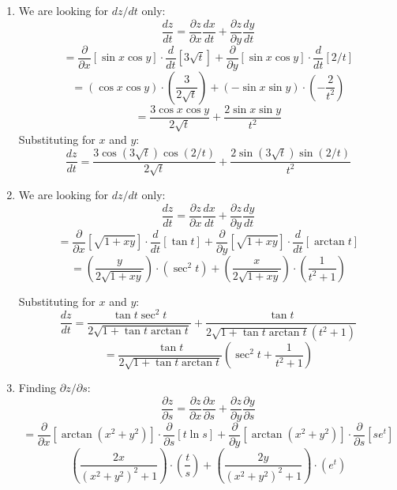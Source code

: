 \begin{Answer}[ref = chain]
\begin{enumerate}
    \item We are looking for $dz / dt$ only:
    $$\frac{dz}{dt} = \frac{\partial z}{\partial x} \frac{dx}{dt} + \frac{
    \partial z}{\partial y} \frac{dy}{dt}$$
    $$= \frac{\partial}{\partial x} \left[ \sin{x}\cos{y} \right] \cdot 
    \frac{d}{dt} \left[ 3\sqrt{t} \right] + \frac{\partial}{\partial y} \left[ 
    \sin{x}\cos{y} \right] \cdot \frac{d}{dt} \left[ 2/t \right]$$
    $$= \left( \cos{x}\cos{y} \right) \cdot \left( \frac{3}{2\sqrt{t}} \right) 
    + \left( -\sin{x}\sin{y} \right) \cdot \left( -\frac{2}{t^2} \right)$$
    $$= \frac{3\cos{x}\cos{y}}{2\sqrt{t}} + \frac{2\sin{x}\sin{y}}{t^2}$$
    Substituting for $x$ and $y$:
    $$\frac{dz}{dt} = \frac{3\cos{ \left( 3\sqrt{t} \right)}\cos{\left(2/t 
    \right)}}{2\sqrt{t}} + \frac{2\sin{\left( 3\sqrt{t} \right)}\sin{ \left( 
    2/t \right)}}{t^2}$$

    \item We are looking for $dz / dt$ only:
    $$\frac{dz}{dt} = \frac{\partial z}{\partial x} \frac{dx}{dt} + \frac{
    \partial z}{\partial y} \frac{dy}{dt}$$
    $$= \frac{\partial}{\partial x} \left[ \sqrt{1 + xy} \right] \cdot 
    \frac{d}{dt} \left[ \tan{t} \right] + \frac{\partial}{\partial y} \left[ 
    \sqrt{1 + xy} \right] \cdot \frac{d}{dt} \left[ \arctan{t} \right]$$
    $$= \left( \frac{y}{2\sqrt{1 + xy}} \right) \cdot \left( \sec^2{t} \right) 
    + \left( \frac{x}{2\sqrt{1 + xy}} \right) \cdot \left( \frac{1}{t^2 + 1} 
    \right)$$

    Substituting for $x$ and $y$:
    $$\frac{dz}{dt} = \frac{\tan{t}\sec^2{t}}{2\sqrt{1 + \tan{t} \arctan{t}}} 
    + \frac{\tan{t}}{2\sqrt{1 + \tan{t} \arctan{t}} \left( t^2 + 1 \right)}$$
    $$= \frac{\tan{t}}{2\sqrt{1 + \tan{t}\arctan{t}}} \left( \sec^2{t} + 
    \frac{1}{t^2 + 1} \right)$$

    \item Finding $\partial z / \partial s$:
    $$\frac{\partial z}{\partial s} = \frac{\partial z}{\partial x}\frac{
    \partial x}{\partial s} + \frac{\partial z}{\partial y} \frac{\partial y}{
    \partial s}$$
    $$= \frac{\partial}{\partial x} \left[ \arctan{ \left( x^2 + y^2 \right)} 
    \right] \cdot \frac{\partial}{\partial s} \left[ t\ln{s} \right] + \frac{
    \partial}{\partial y} \left[ \arctan{ \left( x^2 + y^2 \right)} \right] 
    \cdot \frac{\partial}{\partial s} \left[ se^t \right]$$
    $$\left( \frac{2x}{\left( x^2 + y^2 \right)^2 + 1} \right) \cdot \left( 
    \frac{t}{s} \right) + \left( \frac{2y}{\left( x^2 + y^2 \right)^2 + 1} 
    \right) \cdot \left( e^t \right)$$


\end{enumerate}
\end{Answer}
